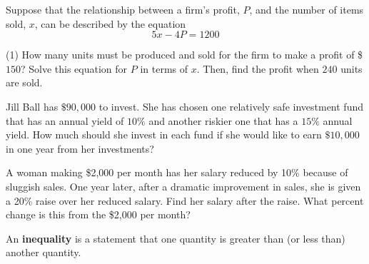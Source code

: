 \documentclass[../mathNotesPreamble]{subfiles}
\begin{document}
  \begin{ex*}
    Suppose that the relationship between a firm's profit, $P$, and the number of items sold, $x$, can be described by the equation
      \[5x-4P=1200\]
    \begin{tasks}[after-item-skip=\stretch{1}](1)
      \task How many units must be produced and sold for the firm to make a profit of \$$150$?
      \task Solve this equation for $P$ in terms of $x$. Then, find the profit when $240$ units are sold.
    \end{tasks}
  \end{ex*}
  \pagebreak
  
  \begin{ex*}
    Jill Ball has $\$90,000$ to invest. She has chosen one relatively safe investment fund that has an annual yield of $10\%$ and another riskier one that has a $15\%$ annual yield. How much should she invest in each fund if she would like to earn $\$10,000$ in one year from her investments?
  \end{ex*}
  
  \begin{ex*}
    A woman making \$2,000 per month has her salary reduced by 10\% because of sluggish sales. One year later, after a dramatic improvement in sales, she is given a 20\% raise over her reduced salary. Find her salary after the raise. What percent change is this from the \$2,000 per month?
  \end{ex*}
  \pagebreak

  \begin{defn*}
    An \textbf{inequality} is a statement that one quantity is greater than (or less than) another quantity.
  \end{defn*}

  
  \pagebreak
\end{document}
